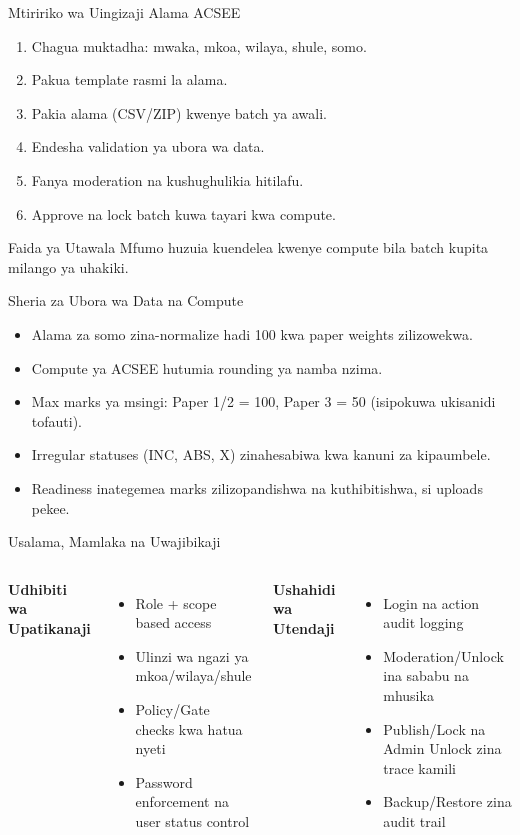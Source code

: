 \documentclass[aspectratio=169,11pt]{beamer}
\begin{document}
\begin{frame}{Mtiririko wa Uingizaji Alama ACSEE}
\begin{enumerate}
  \item Chagua muktadha: mwaka, mkoa, wilaya, shule, somo.
  \item Pakua template rasmi la alama.
  \item Pakia alama (CSV/ZIP) kwenye batch ya awali.
  \item Endesha validation ya ubora wa data.
  \item Fanya moderation na kushughulikia hitilafu.
  \item Approve na lock batch kuwa tayari kwa compute.
\end{enumerate}

\begin{block}{Faida ya Utawala}
Mfumo huzuia kuendelea kwenye compute bila batch kupita milango ya uhakiki.
\end{block}
\end{frame}

\begin{frame}{Sheria za Ubora wa Data na Compute}
\begin{itemize}
  \item Alama za somo zina-normalize hadi 100 kwa paper weights zilizowekwa.
  \item Compute ya ACSEE hutumia rounding ya namba nzima.
  \item Max marks ya msingi: Paper 1/2 = 100, Paper 3 = 50 (isipokuwa ukisanidi tofauti).
  \item Irregular statuses (INC, ABS, X) zinahesabiwa kwa kanuni za kipaumbele.
  \item Readiness inategemea marks zilizopandishwa na kuthibitishwa, si uploads pekee.
\end{itemize}
\end{frame}

\begin{frame}{Usalama, Mamlaka na Uwajibikaji}
\begin{columns}[T]
\textbf{Udhibiti wa Upatikanaji}
\begin{itemize}
  \item Role + scope based access
  \item Ulinzi wa ngazi ya mkoa/wilaya/shule
  \item Policy/Gate checks kwa hatua nyeti
  \item Password enforcement na user status control
\end{itemize}

\textbf{Ushahidi wa Utendaji}
\begin{itemize}
  \item Login na action audit logging
  \item Moderation/Unlock ina sababu na mhusika
  \item Publish/Lock na Admin Unlock zina trace kamili
  \item Backup/Restore zina audit trail
\end{itemize}
\end{columns}
\end{frame}
\end{document}
